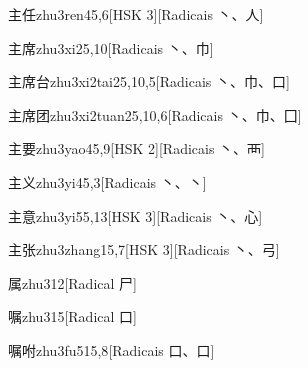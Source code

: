 \begin{entry}{主任}{zhu3ren4}{5,6}[HSK 3][Radicais ⼂、⼈]
\end{entry}

\begin{entry}{主席}{zhu3xi2}{5,10}[Radicais ⼂、⼱]
\end{entry}

\begin{entry}{主席台}{zhu3xi2tai2}{5,10,5}[Radicais ⼂、⼱、⼝]
\end{entry}

\begin{entry}{主席团}{zhu3xi2tuan2}{5,10,6}[Radicais ⼂、⼱、⼞]
\end{entry}

\begin{entry}{主要}{zhu3yao4}{5,9}[HSK 2][Radicais ⼂、⾑]
\end{entry}

\begin{entry}{主义}{zhu3yi4}{5,3}[Radicais ⼂、⼂]
\end{entry}

\begin{entry}{主意}{zhu3yi5}{5,13}[HSK 3][Radicais ⼂、⼼]
\end{entry}

\begin{entry}{主张}{zhu3zhang1}{5,7}[HSK 3][Radicais ⼂、⼸]
\end{entry}

\begin{entry}{属}{zhu3}{12}[Radical ⼫]
\end{entry}

\begin{entry}{嘱}{zhu3}{15}[Radical ⼝]
\end{entry}

\begin{entry}{嘱咐}{zhu3fu5}{15,8}[Radicais ⼝、⼝]
\end{entry}

